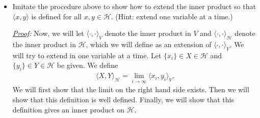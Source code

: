 \documentclass[11pt]{article}
\begin{document}
\begin{enumerate}[(a)]
\begin{itemize}
		
		
		
		
		
		
		
		
		
		
		
		
		
		
		
		\item Imitate the procedure above to show how to extend the inner product so that $\langle x,y\rangle$ is defined for all $x,y\in \mathcal{H}$. (Hint: extend one variable at a time.)
		
		
		\noindent \textit{\underline{Proof}:} Now, we will let $\langle \cdot,\cdot \rangle_V$ denote the inner product in $V$ and $\langle  \cdot, \cdot \rangle_\mathcal{H}$ denote the inner product in $\mathcal{H}$, which we will define as an extension of $\langle \cdot, \cdot \rangle_V$. We will try to extend in one variable at a time. Let $\{x_i\} \in X \in \mathcal{H}$ and $\{y_i\} \in Y \in \mathcal{H}$ be given. We define 
		\begin{align*}
		\langle X,Y\rangle_\mathcal{H} = \lim_{i\to \infty}\langle x_i, y_i\rangle_V.
		\end{align*}
		We will first show that the limit on the right hand side exists. Then we will show that this definition is well defined. Finally, we will show that this definition gives an inner product on $\mathcal{H}$. 
		

\end{itemize}
\end{enumerate}
\end{document}
